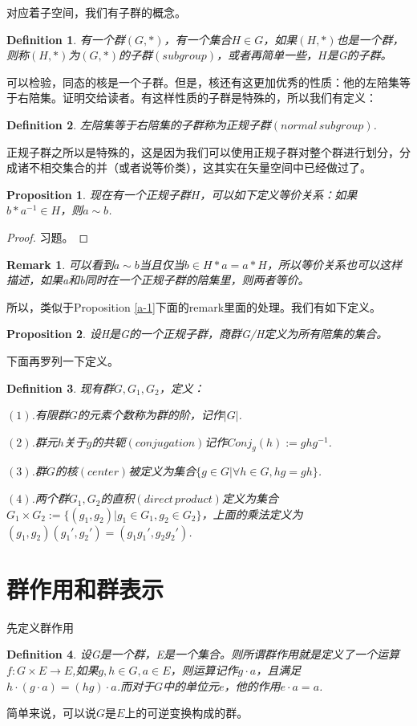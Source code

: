 \documentclass[11pt,a4paper,openany]{book}%
\theoremstyle{plain}%
\newtheorem{pro}{Proposition}[chapter]%
\newtheorem*{rem}{Remark}%
\newtheorem{defi}{Definition}[chapter]%
\begin{document}
对应着子空间，我们有子群的概念。
\begin{defi}有一个群$(G,*)$，有一个集合$H\in G$，如果$(H,*)$也是一个群，则称$(H,*)$为$(G,*)$的子群$(subgroup)$，或者再简单一些，$H$是G的子群。
\end{defi}
可以检验，同态的核是一个子群。但是，核还有这更加优秀的性质：他的左陪集等于右陪集。证明交给读者。有这样性质的子群是特殊的，所以我们有定义：
\begin{defi}左陪集等于右陪集的子群称为正规子群$(normal\,subgroup)$.
\end{defi}
正规子群之所以是特殊的，这是因为我们可以使用正规子群对整个群进行划分，分成诸不相交集合的并（或者说等价类），这其实在矢量空间中已经做过了。
\begin{pro}
现在有一个正规子群$H$，可以如下定义等价关系：如果$b*a^{-1}\in H$，则$a\sim b$.
\end{pro}
\begin{proof}
习题。
\end{proof}
\begin{rem}
可以看到$a\sim b$当且仅当$b\in H*a=a*H$，所以等价关系也可以这样描述，如果a和b同时在一个正规子群的陪集里，则两者等价。
\end{rem}
所以，类似于Proposition \ref{a-1}下面的remark里面的处理。我们有如下定义。
\begin{pro}
设H是G的一个正规子群，商群G/H定义为所有陪集的集合。
\end{pro}
下面再罗列一下定义。
\begin{defi}
现有群$G,G_1,G_2$，定义：

$(1)$.有限群$G$的元素个数称为群的阶，记作$|G|$.

$(2)$.群元$h$关于$g$的共轭$(conjugation)$记作$Conj_g(h):=ghg^{-1}$.

$(3)$.群$G$的核$(center)$被定义为集合$\{g\in G|\forall h\in G,hg=gh\}$.

$(4)$.两个群$G_1,G_2$的直积$(direct\,product)$定义为集合$G_1\times G_2:=\{(g_1,g_2)|g_1\in G_1,g_2\in G_2\}$，上面的乘法定义为$(g_1,g_2)(g_1',g_2')=(g_1g_1',g_2g_2')$.
\end{defi}
\section{群作用和群表示}
先定义群作用
\begin{defi}
设G是一个群，E是一个集合。则所谓群作用就是定义了一个运算$f:G\times E \rightarrow E$,如果$g,h \in G,a \in E$，则运算记作$g\cdot a$，且满足$h\cdot(g\cdot a)=(hg)\cdot a$.而对于$G$中的单位元$e$，他的作用$e\cdot a=a$.
\end{defi}
简单来说，可以说$G$是$E$上的可逆变换构成的群。
\end{document}
